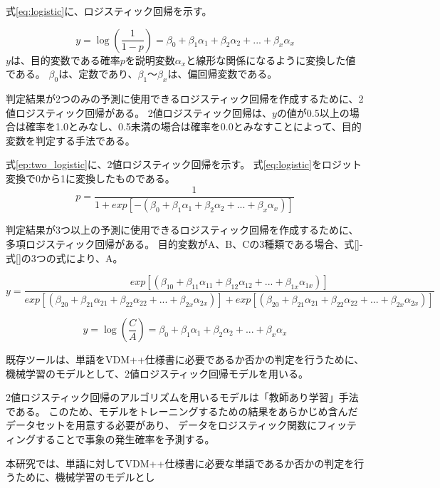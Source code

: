 式\ref{eq:logistic}に、ロジスティック回帰を示す。

\begin{equation}\label{eq:logistic}
    y = \log{(\frac{1}{1-p})}= \beta_{0}+ \beta_{1}\alpha_{1}+\beta_{2}\alpha_{2}+...+\beta_{x}\alpha_{x}
\end{equation}
$y$は、目的変数である確率$p$を説明変数$\alpha_{x}$と線形な関係になるように変換した値である。
$\beta_{0}$は、定数であり、$\beta_{1}～\beta_{x}$は、偏回帰変数である。

判定結果が2つのみの予測に使用できるロジスティック回帰を作成するために、2値ロジスティック回帰がある\cite{two_logistic}。
2値ロジスティック回帰は、$y$の値が0.5以上の場合は確率を1.0とみなし、0.5未満の場合は確率を0.0とみなすことによって、目的変数を判定する手法である。

式\ref{ep:two_logistic}に、2値ロジスティック回帰を示す。
式\ref{eq:logistic}をロジット変換で0から1に変換したものである。
\begin{equation}\label{eq:two_logistic}
    p = \frac{1}{1+exp[- (\beta_{0}+ \beta_{1}\alpha_{1}+\beta_{2}\alpha_{2}+...+\beta_{x}\alpha_{x})]}
\end{equation}

判定結果が3つ以上の予測に使用できるロジスティック回帰を作成するために、多項ロジスティック回帰がある\cite{multinomial_logistic}。
目的変数がA、B、Cの3種類である場合、式\ref{}-式\ref{}の3つの式により、A。

\begin{equation}\label{eq:logistic}
    y = \frac{exp[(\beta_{10}+ \beta_{11}\alpha_{11}+\beta_{12}\alpha_{12}+...+\beta_{1x}\alpha_{1x})]}{exp[(\beta_{20}+ \beta_{21}\alpha_{21}+\beta_{22}\alpha_{22}+...+\beta_{2x}\alpha_{2x})]+exp[(\beta_{20}+ \beta_{21}\alpha_{21}+\beta_{22}\alpha_{22}+...+\beta_{2x}\alpha_{2x})]}
\end{equation}

\begin{equation}\label{eq:logistic}
    y = \log{(\frac{C}{A})}= \beta_{0}+ \beta_{1}\alpha_{1}+\beta_{2}\alpha_{2}+...+\beta_{x}\alpha_{x}
\end{equation}



既存ツールは、単語をVDM++仕様書に必要であるか否かの判定を行うために、機械学習のモデルとして、2値ロジスティック回帰モデルを用いる。
   
2値ロジスティック回帰のアルゴリズムを用いるモデルは「教師あり学習」手法である。
このため、モデルをトレーニングするための結果をあらかじめ含んだデータセットを用意する必要があり、
データをロジスティック関数にフィッティングすることで事象の発生確率を予測する。

本研究では、単語に対してVDM++仕様書に必要な単語であるか否かの判定を行うために、機械学習のモデルとし